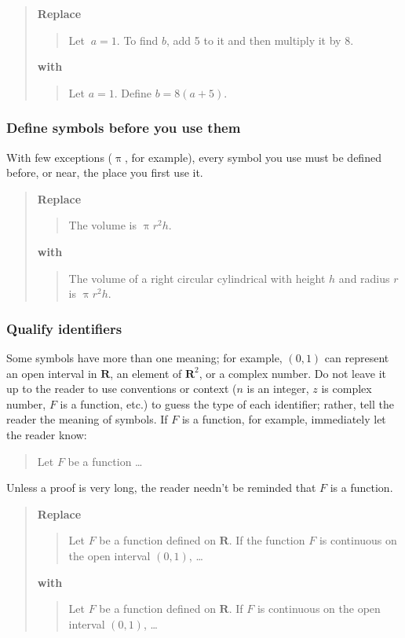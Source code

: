 \documentclass[12pt]{article}
\newcounter{ex}\setcounter{ex}{0}
\newcounter{id}\setcounter{id}{0}
\newcounter{se}\setcounter{se}{0}
\begin{document}
\begin{quote}
\textbf{\textbf{Replace}}
\begin{quote}
   Let \(\ a = 1\). To find \(b\), add 5 to it and then multiply it by 8.
\end{quote}
\textbf{with} 
\begin{quote}
   Let \(a = 1\).  Define \(b = 8 (a + 5)\).
\end{quote}
\end{quote}

 \subsubsection{ Define symbols before you use them}

With few exceptions (\(\uppi\), for example), every symbol you use must be defined
before, or near, the place you first use it.

\begin{quote}
\textbf{\textbf{Replace}}
\begin{quote}
The volume is \(\uppi r^2 h\).
\end{quote}
\textbf{with}
\begin{quote}
The volume of a right circular cylindrical with height \(h\) and
radius \(r\) is \(\uppi r^2 h\).

\end{quote}
\end{quote}
 \subsubsection{  Qualify identifiers} 

Some symbols have more than one meaning; for example, $(0,1)$ can
represent an open interval in $\mathbf{R}$, an element of
\(\mathbf{R}^2\), or a complex number.  Do not leave it up to the reader
to use conventions or context (\(n\) is an integer, \(z\) is complex
number, \(F\) is a function, etc.) to guess the type of each
identifier; rather, tell the reader the meaning of symbols.  If $F$ is
a function, for example, immediately let the reader know:
\begin{quote}
   Let $F$ be a function \dots
\end{quote}
Unless a proof is very long, the reader needn't be reminded that
$F$ is a function. 
\begin{quote}
\textbf{\textbf{Replace}}
\begin{quote}
  Let $F$ be a function defined on $\mathbf{R}$.  If the function $F$ is continuous on
  the open interval $(0,1)$,  \dots
\end{quote}
\textbf{with}
\begin{quote}
  Let \(F\) be a function defined on \(\mathbf{R}\).  If \(F\) is continuous on
  the open interval \((0,1)\), \dots
\end{quote}
\end{quote}
\end{document}
